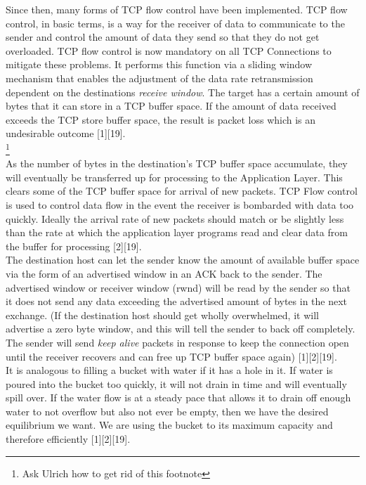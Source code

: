 \documentclass{uathesis}
\begin{document}
Since then, many forms of TCP flow control have been implemented. TCP flow control, in basic terms, is a way for the receiver of data to communicate to the sender and control the amount of data they send so that they do not get overloaded. TCP flow control is now mandatory on all TCP Connections  to mitigate these problems. It performs this function via a sliding window mechanism that enables the adjustment of the data rate retransmission dependent on the destinations \emph{receive window}. The target has a certain amount of bytes that it can store in a TCP buffer space. If the amount of data received exceeds the TCP store buffer space, the result is packet loss which is an undesirable outcome [1][19]. \\

\footnote{Ask Ulrich how to get rid of this footnote} \\

As the number of bytes in the destination's TCP buffer space accumulate, they will eventually be transferred up for processing to the Application Layer. This clears some of the TCP buffer space for arrival of new packets. TCP Flow control is used to control data flow in the event the receiver is bombarded with data too quickly. Ideally the arrival rate of new packets should match or be slightly less than the rate at which the application layer programs read and clear data from the buffer for processing [2][19].\\

The destination host can let the sender know the amount of available buffer space via the form of an advertised window in an ACK back to the sender. The advertised window or receiver window (rwnd) will be read by the sender so that it does not send any data exceeding the advertised amount of bytes in the next exchange. (If the destination host should get wholly overwhelmed, it will advertise a zero byte window, and this will tell the sender to back off completely. The sender will send \emph{keep alive} packets in response to keep the connection open until the receiver recovers and can free up TCP buffer space again) [1][2][19]. \\

It is analogous to filling a bucket with water if it has a hole in it. If water is poured into the bucket too quickly, it will not drain in time and will eventually spill over. If the water flow is at a steady pace that allows it to drain off enough water to not overflow but also not ever be empty, then we have the desired equilibrium we want. We are using the bucket to its maximum capacity and therefore efficiently [1][2][19]. \\
\end{document}
